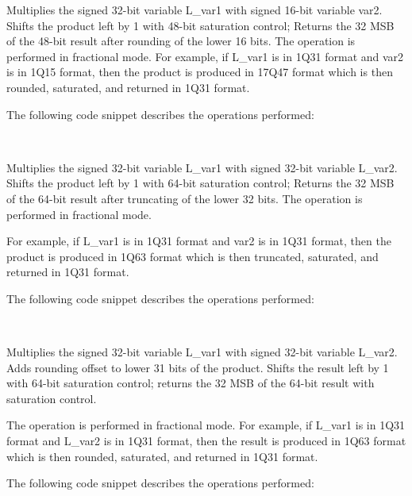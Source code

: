 Multiplies the signed 32-bit variable L\_var1 with signed 16-bit variable var2. Shifts the product left by 1 with 48-bit saturation control; Returns the 32 MSB of the 48-bit result after rounding of the lower 16 bits.
The operation is performed in fractional mode.
For example, if L\_var1 is in 1Q31 format and var2 is in 1Q15 format, then the product is produced in 17Q47 format which is then rounded, saturated, and returned in 1Q31 format.

The following code snippet describes the operations performed:

\\


Multiplies the signed 32-bit variable L\_var1 with signed 32-bit variable L\_var2.
Shifts the product left by 1 with 64-bit saturation control;
Returns the 32 MSB of the 64-bit result after truncating of the lower 32 bits.
The operation is performed in fractional mode.

For example, if L\_var1 is in 1Q31 format and var2 is in 1Q31 format, then the product is produced in 1Q63 format which is then truncated, saturated, and returned in 1Q31 format.

The following code snippet describes the operations performed:

\\


Multiplies the signed 32-bit variable L\_var1 with signed 32-bit variable L\_var2.
Adds rounding offset to lower 31 bits of the product.
Shifts the result left by 1 with 64-bit saturation control; returns the 32 MSB of the 64-bit result with saturation control.

The operation is performed in fractional mode.
For example, if L\_var1 is in 1Q31 format and L\_var2 is in 1Q31 format, then the result is produced in 1Q63 format which is then rounded, saturated, and returned in 1Q31 format.

The following code snippet describes the operations performed:

\\
\\
\\

